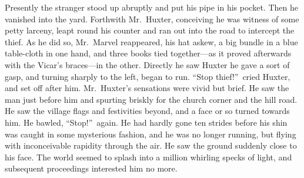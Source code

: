 Presently the stranger stood up abruptly and put his pipe in his pocket. Then he vanished into the yard. Forthwith Mr.\ Huxter, conceiving he was witness of some petty larceny, leapt round his counter and ran out into the road to intercept the thief. As he did so, Mr.\ Marvel reappeared, his hat askew, a big bundle in a blue table-cloth in one hand, and three books tied together—as it proved afterwards with the Vicar’s braces—in the other. Directly he saw Huxter he gave a sort of gasp, and turning sharply to the left, began to run. “Stop thief!”\ cried Huxter, and set off after him. Mr.\ Huxter’s sensations were vivid but brief. He saw the man just before him and spurting briskly for the church corner and the hill road. He saw the village flags and festivities beyond, and a face or so turned towards him. He bawled, “Stop!”\ again. He had hardly gone ten strides before his shin was caught in some mysterious fashion, and he was no longer running, but flying with inconceivable rapidity through the air. He saw the ground suddenly close to his face. The world seemed to splash into a million whirling specks of light, and subsequent proceedings interested him no more.